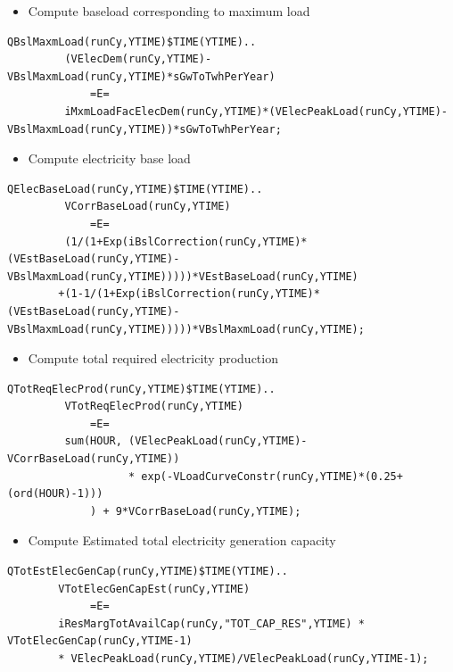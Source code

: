 \documentclass[a4paper,]{scrartcl}
\providecommand{\tightlist}{%
  \setlength{\itemsep}{0pt}\setlength{\parskip}{0pt}}
\begin{document}
\begin{itemize}
\tightlist
\item
  Compute baseload corresponding to maximum load
\end{itemize}

\begin{lstlisting}
QBslMaxmLoad(runCy,YTIME)$TIME(YTIME)..
         (VElecDem(runCy,YTIME)-VBslMaxmLoad(runCy,YTIME)*sGwToTwhPerYear)
             =E=
         iMxmLoadFacElecDem(runCy,YTIME)*(VElecPeakLoad(runCy,YTIME)-VBslMaxmLoad(runCy,YTIME))*sGwToTwhPerYear;  
\end{lstlisting}

\begin{itemize}
\tightlist
\item
  Compute electricity base load
\end{itemize}

\begin{lstlisting}
QElecBaseLoad(runCy,YTIME)$TIME(YTIME)..
         VCorrBaseLoad(runCy,YTIME)
             =E=
         (1/(1+Exp(iBslCorrection(runCy,YTIME)*(VEstBaseLoad(runCy,YTIME)-VBslMaxmLoad(runCy,YTIME)))))*VEstBaseLoad(runCy,YTIME)
        +(1-1/(1+Exp(iBslCorrection(runCy,YTIME)*(VEstBaseLoad(runCy,YTIME)-VBslMaxmLoad(runCy,YTIME)))))*VBslMaxmLoad(runCy,YTIME);
\end{lstlisting}

\begin{itemize}
\tightlist
\item
  Compute total required electricity production
\end{itemize}

\begin{lstlisting}
QTotReqElecProd(runCy,YTIME)$TIME(YTIME)..
         VTotReqElecProd(runCy,YTIME)
             =E=
         sum(HOUR, (VElecPeakLoad(runCy,YTIME)-VCorrBaseLoad(runCy,YTIME))
                   * exp(-VLoadCurveConstr(runCy,YTIME)*(0.25+(ord(HOUR)-1)))
             ) + 9*VCorrBaseLoad(runCy,YTIME);   
\end{lstlisting}

\begin{itemize}
\tightlist
\item
  Compute Estimated total electricity generation capacity
\end{itemize}

\begin{lstlisting}
QTotEstElecGenCap(runCy,YTIME)$TIME(YTIME)..
        VTotElecGenCapEst(runCy,YTIME)
             =E=
        iResMargTotAvailCap(runCy,"TOT_CAP_RES",YTIME) * VTotElecGenCap(runCy,YTIME-1)
        * VElecPeakLoad(runCy,YTIME)/VElecPeakLoad(runCy,YTIME-1);          
\end{lstlisting}
\end{document}
